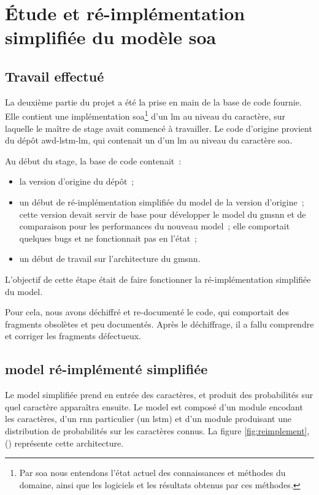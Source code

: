 \section{Étude et ré-implémentation simplifiée du modèle \gls{soa}}
\subsection{Travail effectué}\label{subsec:codebase}
La deuxième partie du projet a été la prise en main de la base de code fournie.
Elle contient une implémentation \gls{soa}\footnote{Par \gls{soa} nous entendons l'état actuel des connaissances et méthodes du domaine, ainsi que les logiciels et les résultats obtenus par ces méthodes.} d'un \gls{lm} au niveau du caractère, sur laquelle le maître de stage avait commencé à travailler.
Le code d'origine provient du dépôt \og awd-lstm-lm\fg{}\autocite{awd_source}, qui contenait un d'un \gls{lm} au niveau du caractère \gls{soa}.

Au début du stage, la base de code contenait~:
\begin{itemize}
	\item la version d'origine du dépôt~;
	\item un début de ré-implémentation simplifiée du \gls{model} de la version d'origine~; cette version  devait servir de base pour développer le \gls{model} du \gls{gmsnn} et de comparaison pour les performances du nouveau \gls{model}~; elle comportait quelques \glspl{bug} et ne fonctionnait pas en l'état~;
	\item un début de travail sur l'architecture du \gls{gmsnn}.
\end{itemize}

\vspace{1em}
L'objectif de cette étape était de faire fonctionner la ré-implémentation simplifiée du \gls{model}.

Pour cela, nous avons déchiffré et re-documenté le code, qui comportait des fragments obsolètes et peu documentés.
Après le déchiffrage, il a fallu comprendre et corriger les fragments défectueux.

\pagebreak
\subsection[\Glsentrytext{model} ré-implémenté simplifiée]{\Gls{model} ré-implémenté simplifiée} 
Le \gls{model} simplifiée prend en entrée des caractères, et produit des probabilités sur quel caractère apparaîtra ensuite.
Le \gls{model} est composé d'un module encodant les caractères, d'un \gls{rnn} particulier (un \gls{lstm}) et d'un module produisant une distribution de probabilités sur les caractères connus. La figure \ref{fig:reimplement}, () représente cette architecture.


